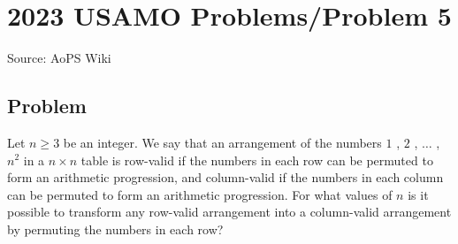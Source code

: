 \documentclass[12pt]{article}
\begin{document}
\section*{{2023 USAMO Problems/Problem 5}}
Source: AoPS Wiki

\subsection*{Problem}
Let $n\geq3$ be an integer. We say that an arrangement of the numbers $1$ , $2$ , $\dots$ , $n^2$ in a $n \times n$ table is row-valid if the numbers in each row can be permuted to form an arithmetic progression, and column-valid if the numbers in each column can be permuted to form an arithmetic progression. For what values of $n$ is it possible to transform any row-valid arrangement into a column-valid arrangement by permuting the numbers in each row?
\end{document}
